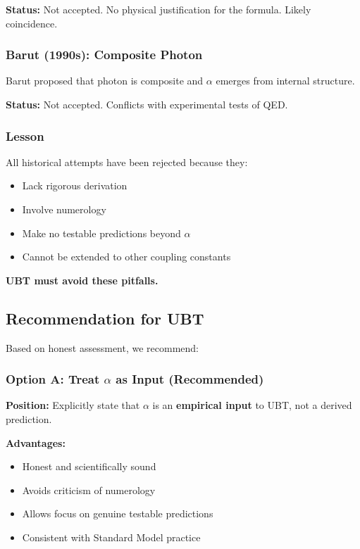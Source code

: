 \textbf{Status:} Not accepted. No physical justification for the formula. Likely coincidence.

\subsubsection{Barut (1990s): Composite Photon}

Barut proposed that photon is composite and $\alpha$ emerges from internal structure.

\textbf{Status:} Not accepted. Conflicts with experimental tests of QED.

\subsubsection{Lesson}

All historical attempts have been rejected because they:
\begin{itemize}
\item Lack rigorous derivation
\item Involve numerology
\item Make no testable predictions beyond $\alpha$
\item Cannot be extended to other coupling constants
\end{itemize}

\textbf{UBT must avoid these pitfalls.}

\subsection{Recommendation for UBT}

Based on honest assessment, we recommend:

\subsubsection{Option A: Treat $\alpha$ as Input (Recommended)}

\textbf{Position:} Explicitly state that $\alpha$ is an \textbf{empirical input} to UBT, not a derived prediction.

\textbf{Advantages:}
\begin{itemize}
\item Honest and scientifically sound
\item Avoids criticism of numerology
\item Allows focus on genuine testable predictions
\item Consistent with Standard Model practice
\end{itemize}

